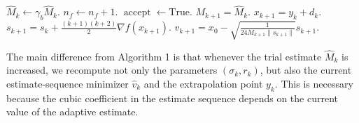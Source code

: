 \begin{itemize}
{\begin{algorithm}[htbp]
\begin{algorithmic}[1]
\[                      \]
                      \ENDIF
                      \label{line.adaptive-backtrack-test}
                      \STATE \(\widehat M_k\leftarrow \gamma_b\widehat M_k\).
                      \STATE \(n_f\leftarrow n_f+1\).
                      \ELSE
                      \STATE \(\operatorname{accept}\leftarrow \mathrm{True}\).
                      \ENDIF
                      \ENDWHILE
                      \STATE \(M_{k+1}=\widehat M_k\).
                      \STATE \(x_{k+1}=y_k+d_k\).
                      \STATE \(\displaystyle s_{k+1}=s_k+\frac{(k+1)(k+2)}{2}\nabla f(x_{k+1})\).
                      \label{line.adaptive-update-s}
                      \STATE \(\displaystyle v_{k+1}
                      = x_0-\sqrt{\frac{1}{24M_{k+1}\|s_{k+1}\|}}s_{k+1}\).
                      \label{line.adaptive-update-v}
                      \ENDFOR
                  \end{algorithmic}
              \end{algorithm}

              The main difference from Algorithm 1 is that whenever the trial estimate \(\widehat M_k\) is increased, we recompute not only the parameters \((\sigma_k,r_k)\), but also the current estimate-sequence minimizer \(\widehat v_k\) and the extrapolation point \(y_k\). This is necessary because the cubic coefficient in the estimate sequence depends on the current value of the adaptive estimate.

}
\end{itemize}
